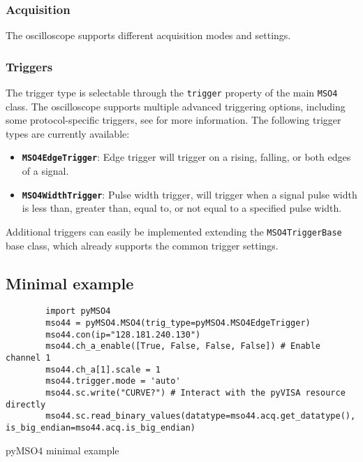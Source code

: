 \documentclass[a4paper,english,twoside,10pt]{article}
\begin{document}
\subsubsection{Acquisition}
The oscilloscope supports different acquisition modes and settings.

\subsubsection{Triggers}
The trigger type is selectable through the \texttt{trigger} property of the main \texttt{MSO4} class. The oscilloscope supports multiple advanced triggering options, including some protocol-specific triggers, see \cite[p.~159]{tektronix:mso-progman}\cite[p.~121]{tektronix:mso-help} for more information. The following trigger types are currently available:
\begin{itemize}
	\item \textbf{\texttt{MSO4EdgeTrigger}}: Edge trigger will trigger on a rising, falling, or both edges of a signal.
	\item \textbf{\texttt{MSO4WidthTrigger}}: Pulse width trigger, will trigger when a signal pulse width is less than, greater than, equal to, or not equal to a specified pulse width.
\end{itemize}

Additional triggers can easily be implemented extending the \texttt{MSO4TriggerBase} base class, which already supports the common trigger settings.

\subsection{Minimal example}

\begin{flushleft}
	\captionsetup{type=listing}
	\begin{verbatim}
		import pyMSO4
		mso44 = pyMSO4.MSO4(trig_type=pyMSO4.MSO4EdgeTrigger)
		mso44.con(ip="128.181.240.130")
		mso44.ch_a_enable([True, False, False, False]) # Enable channel 1
		mso44.ch_a[1].scale = 1
		mso44.trigger.mode = 'auto'
		mso44.sc.write("CURVE?") # Interact with the pyVISA resource directly
		mso44.sc.read_binary_values(datatype=mso44.acq.get_datatype(), is_big_endian=mso44.acq.is_big_endian)
	\end{verbatim}
	\caption{pyMSO4 minimal example}
\end{flushleft}
\end{document}
